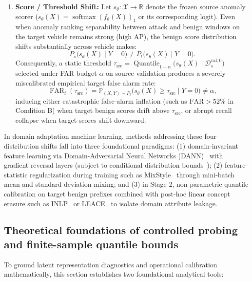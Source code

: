 \documentclass[12pt, a4paper, reqno, oneside]{book}
\begin{document}
\begin{enumerate}
    \item \textbf{Score / Threshold Shift:} Let $s_\theta : \mathcal{X} \to \mathbb{R}$ denote the frozen source anomaly scorer ($s_\theta(X) = \operatorname{softmax}(f_\theta(X))_1$ or its corresponding logit). Even when anomaly ranking separability between attack and benign windows on the target vehicle remains strong (high AP), the benign score distribution shifts substantially across vehicle makes:
    \begin{equation}\label{eq:score-shift}
    P_s\big(s_\theta(X) \mid Y = 0\big) \neq P_t\big(s_\theta(X) \mid Y = 0\big).
    \end{equation}
    Consequently, a static threshold $\tau_{\text{src}} = \operatorname{Quantile}_{1-\alpha}\!\big(s_\theta(X) \mid \mathcal{D}_s^{\text{val},0}\big)$ selected under FAR budget $\alpha$ on source validation produces a severely miscalibrated empirical target false alarm rate:
    \begin{equation}\label{eq:threshold-mismatch}
    \operatorname{FAR}_t(\tau_{\text{src}}) = \mathbb{P}_{(X,Y)\sim P_t}\big(s_\theta(X) \ge \tau_{\text{src}} \mid Y = 0\big) \neq \alpha,
    \end{equation}
    inducing either catastrophic false-alarm inflation (such as $\text{FAR} > 52\%$ in Condition B) when target benign scores drift above $\tau_{\text{src}}$, or abrupt recall collapse when target scores shift downward.
\end{enumerate}

In domain adaptation machine learning, methods addressing these four distribution shifts fall into three foundational paradigms: (1) domain-invariant feature learning via Domain-Adversarial Neural Networks (DANN)~\cite{ganin2016dann} with gradient reversal layers (subject to conditional distribution bounds~\cite{zhao2019invariant}); (2) feature-statistic regularization during training such as MixStyle~\cite{zhou2021mixstyle} through mini-batch mean and standard deviation mixing; and (3) in Stage 2, non-parametric quantile calibration on target benign prefixes combined with post-hoc linear concept erasure such as INLP~\cite{ravfogel2020null} or LEACE~\cite{belrose2023leace} to isolate domain attribute leakage.

\subsection{Theoretical foundations of controlled probing and finite-sample quantile bounds}\label{subsec:theory-probing-dkw}
To ground latent representation diagnostics and operational calibration mathematically, this section establishes two foundational analytical tools:
\end{document}
